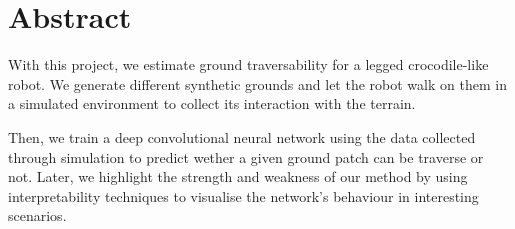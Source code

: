 \documentclass[../document.tex]{subfiles}
\begin{document}
\section{Abstract}
With this project, we estimate ground traversability for a legged crocodile-like robot. We generate different synthetic grounds and let the robot walk on them in a simulated environment to collect its interaction with the terrain.  

Then, we train a deep convolutional neural network using the data collected through simulation to predict wether a given ground patch can be traverse or not. Later, we highlight the strength and weakness of our method
by using interpretability techniques to visualise the network's behaviour in interesting scenarios.
 

\end{document}
